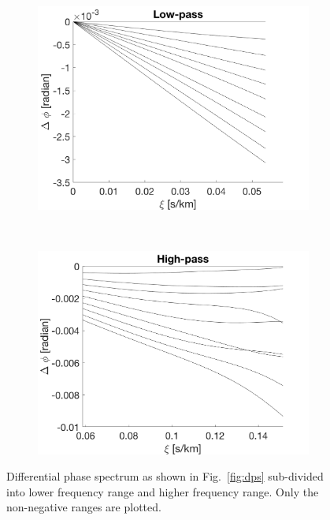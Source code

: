\begin{figure}[tbp]	
    \begin{subfigure}[b]{0.49\textwidth}
        \includegraphics[width=\textwidth]{./Figures/Methods/4-Relative_phase_angle_L.png}
    \end{subfigure}
	~
    \begin{subfigure}[b]{0.49\textwidth}
        \includegraphics[width=\textwidth]{./Figures/Methods/4-Relative_phase_angle_H.png}
    \end{subfigure}	

    \caption[Low-pass and high-pass filters]
    {Differential phase spectrum as shown in Fig.~\ref{fig:dps} sub-divided into lower frequency range and higher frequency range. Only the non-negative ranges are plotted.}
\label{fig:low-high-pass}
\end{figure}    

